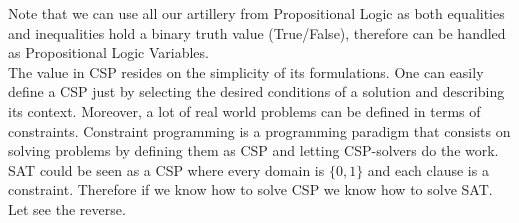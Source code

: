 Note that we can use all our artillery from Propositional Logic as both equalities and inequalities hold a binary truth value (True/False), therefore can be handled as Propositional Logic Variables. \\

The value in CSP resides on the simplicity of its formulations.  One can  easily define a CSP just by selecting the desired conditions of a solution and describing its context. Moreover, a lot of real world problems can be defined in terms of constraints. Constraint programming is a programming paradigm that consists on solving problems by defining them as CSP and letting CSP-solvers do the work.\\

SAT could be seen as a CSP where every domain is $\{0,1\}$ and each clause is a constraint. Therefore if we know how to solve CSP we know how to solve SAT. Let see the reverse.

